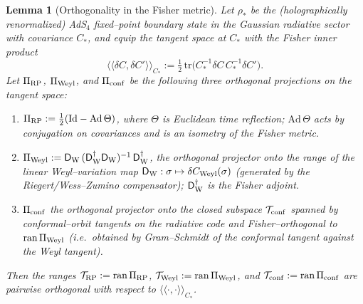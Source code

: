 \documentclass[10pt]{article}
\theoremstyle{definition}
\theoremstyle{plain}
\newtheorem{lemma}{Lemma}[section]
\begin{document}
\begin{lemma}[Orthogonality in the Fisher metric]\label{lem:tan-orth}
Let $\rho_\ast$ be the (holographically renormalized) AdS$_4$ fixed–point boundary state in the
Gaussian radiative sector with covariance $C_\ast$, and equip the tangent space at $C_\ast$ with the
Fisher inner product
\[
\big\langle\!\big\langle \delta C,\delta C'\big\rangle\!\big\rangle_{C_\ast}
:= \tfrac12\,\mathrm{tr}\!\big(C_\ast^{-1}\delta C\,C_\ast^{-1}\delta C'\big).
\]
Let $\Pi_{\rm RP}$, $\Pi_{\rm Weyl}$, and $\Pi_{\rm conf}$ be the following three orthogonal
projections on the tangent space:
\begin{enumerate}
\item $\Pi_{\rm RP}:=\tfrac12(\mathrm{Id}-\mathrm{Ad}\,\Theta)$, where $\Theta$ is Euclidean
time reflection; $\mathrm{Ad}\,\Theta$ acts by conjugation on covariances and is an isometry
of the Fisher metric.
\item $\Pi_{\rm Weyl}:=\mathsf D_{\rm W}\,(\mathsf D_{\rm W}^\dagger\mathsf D_{\rm W})^{-1}\,\mathsf D_{\rm W}^\dagger$,
the orthogonal projector onto the range of the linear Weyl–variation map
$\mathsf D_{\rm W}:\sigma\mapsto\delta C_{\rm Weyl}(\sigma)$ (generated by the Riegert/Wess–Zumino
compensator); $\mathsf D_{\rm W}^\dagger$ is the Fisher adjoint.
\item $\Pi_{\rm conf}$ the orthogonal projector onto the closed subspace
$\mathcal T_{\rm conf}$ spanned by conformal–orbit tangents on the radiative code \emph{and}
Fisher–orthogonal to $\mathrm{ran}\,\Pi_{\rm Weyl}$ (i.e.\ obtained by Gram–Schmidt of the conformal
tangent against the Weyl tangent).
\end{enumerate}
Then the ranges $\mathcal T_{\rm RP}:=\mathrm{ran}\,\Pi_{\rm RP}$,
$\mathcal T_{\rm Weyl}:=\mathrm{ran}\,\Pi_{\rm Weyl}$, and
$\mathcal T_{\rm conf}:=\mathrm{ran}\,\Pi_{\rm conf}$ are pairwise orthogonal with respect
to $\langle\!\langle\cdot,\cdot\rangle\!\rangle_{C_\ast}$.
\end{lemma}
\end{document}
